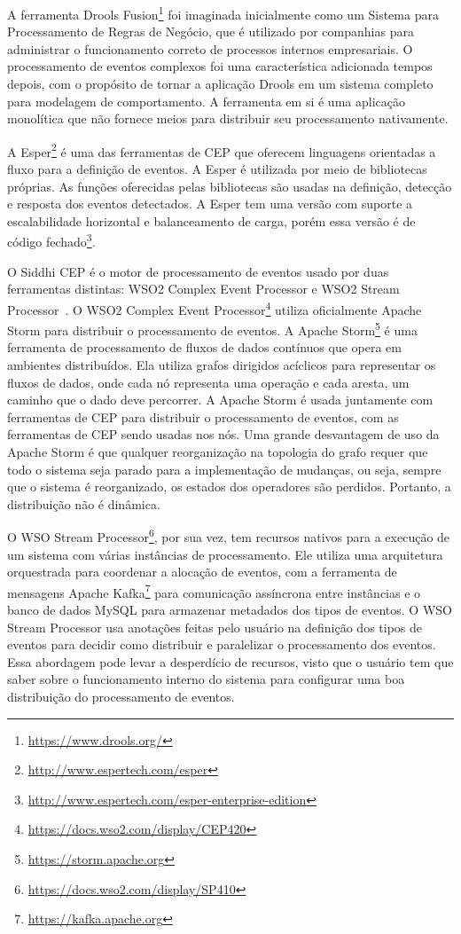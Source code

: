 A ferramenta Drools Fusion\footnote{\url{https://www.drools.org/}} foi imaginada inicialmente como um Sistema para Processamento de Regras de Negócio, que é utilizado por companhias para administrar o funcionamento correto de processos internos empresariais. O processamento de eventos complexos foi uma característica adicionada tempos depois, com o propósito de tornar a aplicação Drools em um sistema completo para modelagem de comportamento. A ferramenta em si é uma aplicação monolítica que não fornece meios para distribuir seu processamento nativamente. %

A Esper\footnote{\url{http://www.espertech.com/esper}} é uma das ferramentas de CEP que oferecem linguagens orientadas a fluxo para a definição de eventos. A Esper é utilizada por meio de bibliotecas próprias. As funções oferecidas pelas bibliotecas são usadas na definição, detecção e resposta dos eventos detectados. A Esper tem uma versão com suporte a escalabilidade horizontal e balanceamento de carga, porém essa versão é de código fechado\footnote{\url{http://www.espertech.com/esper-enterprise-edition}}.

O Siddhi CEP é o motor de processamento de eventos usado
por duas ferramentas distintas: WSO2 Complex Event Processor e WSO2 Stream Processor~\citep{WSO2vsSiddhi}.
O WSO2 Complex Event Processor\footnote{\url{ https://docs.wso2.com/display/CEP420}}  utiliza oficialmente  Apache Storm para distribuir o processamento de eventos. A Apache Storm\footnote{\url{https://storm.apache.org}} é uma ferramenta de processamento de fluxos de dados contínuos que opera em ambientes distribuídos. Ela utiliza grafos dirigidos acíclicos para representar os fluxos de dados, onde cada nó representa uma operação e cada aresta, um caminho que o dado deve percorrer. A Apache Storm é usada juntamente com ferramentas de CEP para distribuir o processamento de eventos, com as ferramentas de CEP sendo usadas nos nós. Uma grande desvantagem de uso da Apache Storm é que qualquer reorganização na topologia do grafo requer que todo o sistema seja parado para a implementação de mudanças, ou seja, sempre que o sistema é reorganizado, os estados dos operadores são perdidos. Portanto, a distribuição não é dinâmica.

O WSO Stream Processor\footnote{\url{https://docs.wso2.com/display/SP410}}, por sua vez, tem recursos nativos para a execução de um sistema com várias instâncias de processamento. Ele utiliza uma arquitetura orquestrada para coordenar a alocação de eventos, com a ferramenta de mensagens Apache Kafka\footnote{\url{https://kafka.apache.org}}  para comunicação assíncrona entre instâncias e o banco de dados MySQL para armazenar metadados dos tipos de eventos. O WSO Stream Processor usa anotações feitas pelo usuário na definição dos tipos de eventos para decidir como distribuir e paralelizar o processamento dos eventos. Essa abordagem pode levar a desperdício de recursos, visto que o usuário tem que saber sobre o funcionamento interno do sistema para configurar uma boa distribuição do processamento de eventos.



